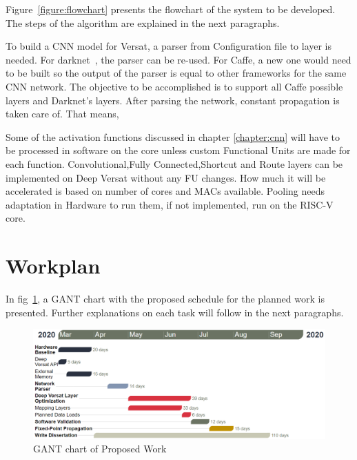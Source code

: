 Figure~\ref{figure:flowchart} presents the flowchart of the system to be developed. The steps
of the algorithm are explained in the next paragraphs.

To build a CNN model for Versat, a parser from Configuration file to layer is needed. For darknet~\cite{darknet},
 the parser can be re-used.
For Caffe, a new one would need to be built so the output of the parser is equal to other frameworks for the same CNN network.
The objective to be accomplished is to support all Caffe possible layers and Darknet's layers.
After parsing the network, constant propagation is taken care of. That means,

Some of the activation functions discussed in chapter \ref{chapter:cnn}
will have to be processed in software on the core unless custom Functional Units
are made for each function. Convolutional,Fully Connected,Shortcut and Route
layers can be implemented on Deep Versat without any FU changes. How much it
will be accelerated is based on number of cores and MACs available. Pooling
needs adaptation in Hardware to run them, if not implemented, run on the RISC-V
core.

\section{Workplan}

In fig~\ref{figure:gant}, a GANT chart with the proposed schedule for the
planned work is presented. Further explanations on each task will follow in the
next paragraphs.

\begin{figure}[!htbp]
    \includegraphics[width=1\textwidth]{Figures/gant2.png}
    \caption{GANT chart of Proposed Work}
    \label{figure:gant}
\end{figure}





